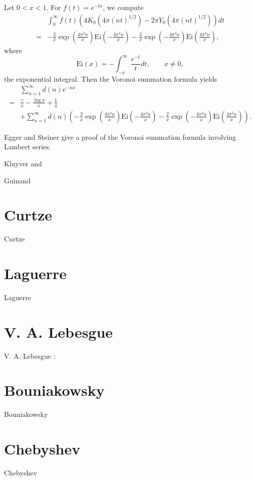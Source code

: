 \documentclass{article}
\newcommand{\Ei}{\mathrm{Ei}}
\begin{document}
Let $0<x<1$. For $f(t)=e^{-tx}$, we compute 
\[
\begin{split}
&\int_0^\infty f(t)(4K_0(4\pi(nt)^{1/2})-2\pi Y_0(4\pi(nt)^{1/2})) dt\\
=&
-\frac{2}{x}\exp\left(\frac{4\pi^2 n}{x}\right) \Ei\left(-\frac{4\pi^2 n}{x}\right)
-\frac{2}{x}\exp\left(-\frac{4\pi^2 n}{x}\right) \Ei\left(\frac{4\pi^2 n}{x}\right),
\end{split}
\]
where
\[
\Ei(x) = -\int_{-x}^\infty \frac{e^{-t}}{t} dt, \qquad x \neq 0,
\]
the exponential integral.
Then the Voronoi summation formula yields
\[
\begin{split}
&\sum_{n=1}^\infty d(n) e^{-nx}\\
=& \frac{\gamma}{x} - \frac{\log x}{x} + \frac{1}{4}\\
&+ \sum_{n=1}^\infty d(n)
\left(
-\frac{2}{x}\exp\left(\frac{4\pi^2 n}{x}\right) \Ei\left(-\frac{4\pi^2 n}{x}\right)
-\frac{2}{x}\exp\left(-\frac{4\pi^2 n}{x}\right) \Ei\left(\frac{4\pi^2 n}{x}\right)
\right).
\end{split}
\]


Egger and Steiner \cite{egger} give a proof  of the Voronoi summation formula involving Lambert series.

Kluyver \cite{kluyver1919} and \cite{kluyver1922}

Guinand \cite{guinand}

\section{Curtze}
Curtze \cite{curtze}


\section{Laguerre}
Laguerre \cite{laguerre}


\section{V. A. Lebesgue}
V. A. Lebesgue \cite{lebesgue}:





\section{Bouniakowsky}
Bouniakowsky \cite{bouniakowsky}


\section{Chebyshev}
Chebyshev \cite{tchebychef}
\end{document}
